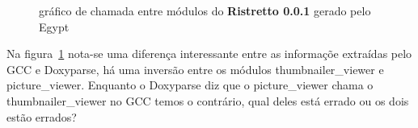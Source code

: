 \begin{figure}
\center
{}
\qquad
{}
\label{ristretto-0.0.1}
\caption{gráfico de chamada entre módulos do {\bf Ristretto 0.0.1} gerado pelo Egypt}
\end{figure}

Na figura~\ref{ristretto-0.0.1} nota-se uma diferença interessante entre as informaçõe extraídas pelo GCC e Doxyparse, há uma inversão entre os módulos thumbnailer\_viewer e picture\_viewer. Enquanto o Doxyparse diz que o picture\_viewer chama o thumbnailer\_viewer no GCC temos o contrário, qual deles está errado ou os dois estão errados?

